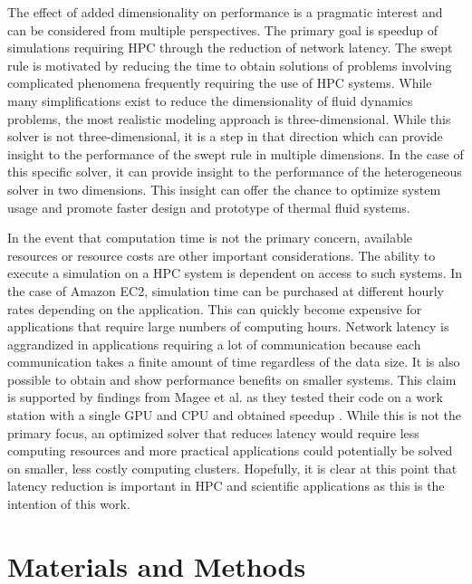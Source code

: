 \documentclass[journal,article,submit,moreauthors,pdftex]{Definitions/mdpi}
\begin{document}
\par
The effect of added dimensionality on performance is a pragmatic interest and can be considered from multiple perspectives. The primary goal is speedup of simulations requiring HPC through the reduction of network latency. The swept rule is motivated by reducing the time to obtain solutions of problems involving complicated phenomena frequently requiring the use of HPC systems. While many simplifications exist to reduce the dimensionality of fluid dynamics problems, the most realistic modeling approach is three-dimensional. While this solver is not three-dimensional, it is a step in that direction which can provide insight to the performance of the swept rule in multiple dimensions. In the case of this specific solver, it can provide insight to the performance of the heterogeneous solver in two dimensions. This insight can offer the chance to optimize system usage and promote faster design and prototype of thermal fluid systems.

\par
In the event that computation time is not the primary concern, available resources or resource costs are other important considerations. The ability to execute a simulation on a HPC system is dependent on access to such systems. In the case of Amazon EC2, simulation time can be purchased at different hourly rates depending on the application\cite{AmazonServices}. This can quickly become expensive for applications that require large numbers of computing hours. Network latency is aggrandized in applications requiring a lot of communication because each communication takes a finite amount of time regardless of the data size. It is also possible to obtain and show performance benefits on smaller systems. This claim is supported by findings from Magee et al. as they tested their code on a work station with a single GPU and CPU and obtained speedup \cite{Magee2018AcceleratingDecomposition}. While this is not the primary focus, an optimized solver that reduces latency would require less computing resources and more practical applications could potentially be solved on smaller, less costly computing clusters. Hopefully, it is clear at this point that latency reduction is important in HPC and scientific applications as this is the intention of this work.


\section{Materials and Methods}
\label{methods-section}
\end{document}
